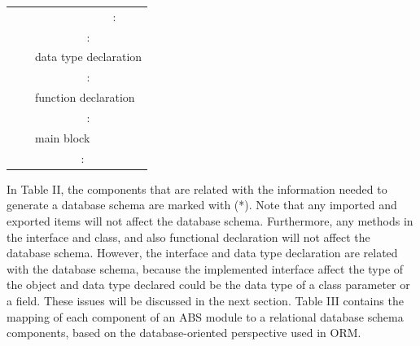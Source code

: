 \documentclass[conference]{IEEEtran}
\begin{document}
\begin{table}[]
\begin{tabular}{|l|l|l|l|l|}
		&                          &                            & \multicolumn{2}{c|}{:}                     \\ \cline{3-5}
		&                          & \multicolumn{3}{c|}{:}                                                  \\ \cline{3-5}
		&                          & \multicolumn{3}{l|}{data type declaration}                              \\ \cline{3-5}
		&                          & \multicolumn{3}{c|}{:}                                                  \\ \cline{3-5}
		&                          & \multicolumn{3}{l|}{function declaration}                               \\ \cline{3-5}
		&                          & \multicolumn{3}{c|}{:}                                                  \\ \cline{3-5}
		&                          & \multicolumn{3}{l|}{main block}                                         \\ \cline{2-5}
		& \multicolumn{4}{c|}{:}                                                                             \\ \hline
	\end{tabular}
\end{table}

In Table II, the components that are related with the information needed to generate a database schema are marked with (*). Note that any imported and exported items will not affect the database schema. Furthermore, any methods in the interface and class, and also functional declaration will not affect the database schema. However, the interface and data type declaration are related with the database schema, because the implemented interface affect the type of the object and data type declared could be the data type of a class parameter or a field. These issues will be discussed in the next section. Table III contains the mapping of each component of an ABS module to a relational database schema components, based on the database-oriented perspective used in ORM.
\end{document}
